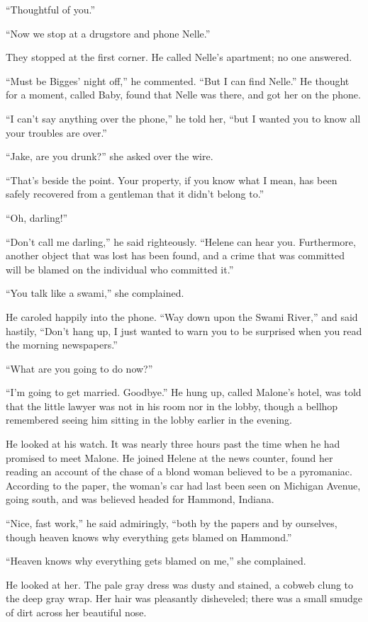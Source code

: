 \documentclass{novel}
\begin{document}
“Thoughtful of you.”

“Now we stop at a drugstore and phone Nelle.”

They stopped at the first corner. He called Nelle’s apartment; no one answered.

“Must be Bigges’ night off,” he commented. “But I can find Nelle.” He thought for a moment, called Baby, found that Nelle was there, and got her on the phone.

“I can’t say anything over the phone,” he told her, “but I wanted you to know all your troubles are over.”

“Jake, are you drunk?” she asked over the wire.

“That’s beside the point. Your property, if you know what I mean, has been safely recovered from a gentleman that it didn’t belong to.”

“Oh, darling!”

“Don’t call me darling,” he said righteously. “Helene can hear you. Furthermore, another object that was lost has been found, and a crime that was committed will be blamed on the individual who committed it.”

“You talk like a swami,” she complained.

He caroled happily into the phone. “Way down upon the Swami River,” and said hastily, “Don’t hang up, I just wanted to warn you to be surprised when you read the morning newspapers.”

“What are you going to do now?”

“I’m going to get married. Goodbye.” He hung up, called Malone’s hotel, was told that the little lawyer was not in his room nor in the lobby, though a bellhop remembered seeing him sitting in the lobby earlier in the evening.

He looked at his watch. It was nearly three hours past the time when he had promised to meet Malone. He joined Helene at the news counter, found her reading an account of the chase of a blond woman believed to be a pyromaniac. According to the paper, the woman’s car had last been seen on Michigan Avenue, going south, and was believed headed for Hammond, Indiana.

“Nice, fast work,” he said admiringly, “both by the papers and by ourselves, though heaven knows why everything gets blamed on Hammond.”

“Heaven knows why everything gets blamed on me,” she complained.

He looked at her. The pale gray dress was dusty and stained, a cobweb clung to the deep gray wrap. Her hair was pleasantly disheveled; there was a small smudge of dirt across her beautiful nose.
\end{document}
